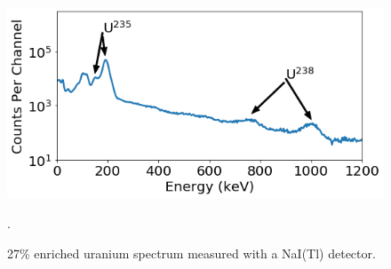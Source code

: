 \begin{figure}[H]
	\centering
	\includegraphics[width=0.8\linewidth]{images/enriched_u_peaks_displayed}
	\caption{27\% enriched uranium spectrum measured with a NaI(Tl) detector.}.
	\label{fig:enriched_u_peaks_displayed}
\end{figure}

